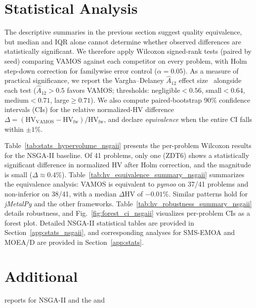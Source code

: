 \documentclass[final,5p,times,twocolumn]{elsarticle}
\newcommand{\VAMOS}{VAMOS}
\newcommand{\HV}{\mathrm{HV}}
\begin{document}
%

\section{Statistical Analysis}
\label{app:stats_main}

The descriptive summaries in the previous section suggest quality equivalence, but median and IQR alone cannot determine whether observed differences are statistically significant. We therefore apply Wilcoxon signed-rank tests (paired by seed) comparing \VAMOS{} against each competitor on every problem, with Holm step-down correction for familywise error control ($\alpha=0.05$). As a measure of practical significance, we report the Vargha--Delaney $\hat{A}_{12}$ effect size~\cite{VD00} alongside each test ($\hat{A}_{12}>0.5$ favors \VAMOS{}; thresholds: negligible${}<0.56$, small${}<0.64$, medium${}<0.71$, large${\ge}0.71$). We also compute paired-bootstrap 90\% confidence intervals (CIs) for the relative normalized-HV difference $\Delta = (\HV_{\text{VAMOS}} - \HV_{\text{fw}})/\HV_{\text{fw}}$, and declare \emph{equivalence} when the entire CI falls within $\pm 1\%$.

Table~\ref{tab:stats_hypervolume_nsgaii} presents the per-problem Wilcoxon results for the NSGA-II baseline. Of 41 problems, only one (ZDT6) shows a statistically significant difference in normalized HV after Holm correction, and the magnitude is small ($\Delta \approx 0.4\%$). Table~\ref{tab:hv_equivalence_summary_nsgaii} summarizes the equivalence analysis: \VAMOS{} is equivalent to \textit{pymoo} on 37/41 problems and non-inferior on 38/41, with a median $\Delta$HV of $-0.01\%$. Similar patterns hold for \textit{jMetalPy} and the other frameworks. Table~\ref{tab:hv_robustness_summary_nsgaii} details robustness, and Fig.~\ref{fig:forest_ci_nsgaii} visualizes per-problem CIs as a forest plot. Detailed NSGA-II statistical tables are provided in Section~\ref{app:stats_nsgaii}, and corresponding analyses for SMS-EMOA and MOEA/D are provided in Section~\ref{app:stats}.

\section{Additional }
\label{app:variants}
 reports  for  NSGA-II  and  the  and 
\end{document}

